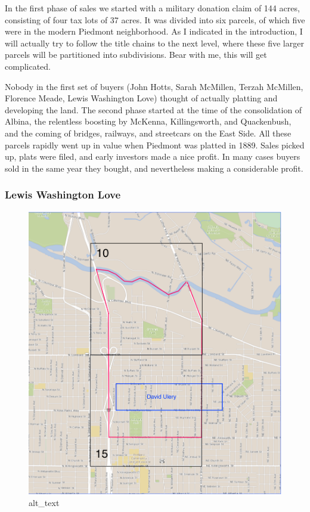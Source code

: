 \documentclass[
  12pt,
]{book}
\begin{document}
In the first phase of sales we started with a military donation claim of 144 acres, consisting of four tax lots of 37 acres. It was divided into six parcels, of which five were in the modern Piedmont neighborhood. As I indicated in the introduction, I will actually try to follow the title chains to the next level, where these five larger parcels will be partitioned into subdivisions. Bear with me, this will get complicated.

Nobody in the first set of buyers (John Hotts, Sarah McMillen, Terzah McMillen, Florence Meade, Lewis Washington Love) thought of actually platting and developing the land. The second phase started at the time of the consolidation of Albina, the relentless boosting by McKenna, Killingsworth, and Quackenbush, and the coming of bridges, railways, and streetcars on the East Side. All these parcels rapidly went up in value when Piedmont was platted in 1889. Sales picked up, plats were filed, and early investors made a nice profit. In many cases buyers sold in the same year they bought, and nevertheless making a considerable profit.

\hypertarget{lewis-washington-love}{%
\subsubsection{Lewis Washington Love}\label{lewis-washington-love}}

\begin{figure}
\centering
\includegraphics{images/0202a_images/image5.png}
\caption{alt\_text}
\end{figure}
\end{document}
